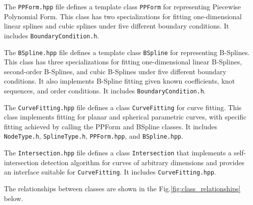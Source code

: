 \documentclass[a4paper]{article}
\begin{document}
\begin{sloppypar}
The \verb|PPForm.hpp| file defines a template class \verb|PPForm| for
representing Piecewise Polynomial Form. This class has two specializations for
fitting one-dimensional linear splines and cubic splines under five different
boundary conditions. It includes \verb|BoundaryCondition.h|.

The \verb|BSpline.hpp| file defines a template class \verb|BSpline| for
representing B-Splines. This class has three specializations for fitting
one-dimensional linear B-Splines, second-order B-Splines, and cubic B-Splines
under five different boundary conditions. It also implements B-Spline fitting
given known coefficients, knot sequences, and order conditions. It includes
\verb|BoundaryCondition.h|.

The \verb|CurveFitting.hpp| file defines a class \verb|CurveFitting| for curve
fitting. This class implements fitting for planar and spherical parametric
curves, with specific fitting achieved by calling the PPForm and BSpline
classes. It includes \verb|NodeType.h|, \verb|SplineType.h|, \verb|PPForm.hpp|,
and \verb|BSpline.hpp|.

The \verb|Intersection.hpp| file defines a class \verb|Intersection| that
implements a self-intersection detection algorithm for curves of arbitrary
dimensions and provides an interface suitable for \verb|CurveFitting|. It
includes \verb|CurveFitting.hpp|.

The relationships between classes are shown in the
Fig.\ref{fig:class_relationships} below.

\begin{figure}[H]
  \centering
\end{figure}
\end{sloppypar}
\end{document}
